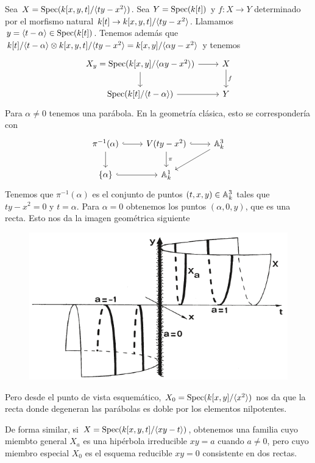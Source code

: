 \documentclass[GA.tex]{subfiles}
\begin{document}
\begin{ej}
Sea $X=\operatorname{Spec}(k[x,y,t]/\langle{ty-x^2}\rangle)$. Sea $Y=\operatorname{Spec}(k[t])$ y $f:X\to Y$ determinado por el morfismo natural $k[t]\to k[x,y,t]/\langle{ty-x^2}\rangle$. Llamamos $y=\langle{t-\alpha}\rangle\in\operatorname{Spec}(k[t])$. Tenemos además que $k[t]/\langle{t-\alpha}\rangle\otimes k[x,y,t]/\langle{ty-x^2}\rangle=k[x,y]/\langle{\alpha y-x^2}\rangle$ y tenemos
\[
\begin{tikzcd}
X_y=\spec(k[x,y]/\gene{\alpha y-x^2})\arrow[r] \arrow[d]  & X\arrow[d, "f"]\\
\spec(k[t]/\gene{t-\alpha})\arrow[r] & Y
\end{tikzcd}
\]
Para $\alpha\neq 0$ tenemos una parábola. En la geometría clásica, esto se correspondería con
\[
\begin{tikzcd}
\pi^{-1}(\alpha)\arrow[d]\arrow[r, hookrightarrow] & V(ty-x^2)\arrow[r, hookrightarrow]\arrow[d,"\pi"] & \A^3_k\arrow[dl]\\
\{\alpha\} \arrow[r, hookrightarrow] & \A^1_k & 
\end{tikzcd}
\]
Tenemos que $\pi^{-1}(\alpha)$ es el conjunto de puntos $(t,x,y)\in\mathbb{A}_k^3$ tales que $ty-x^2=0$ y $t=\alpha$. Para $\alpha=0$ obtenemos los puntos $(\alpha,0,y)$, que es una recta. Esto nos da la imagen geométrica siguiente
\begin{figure}[h!]
\includegraphics[scale=0.5]{3-3-1}
\end{figure}

Pero desde el punto de vista esquemático, $X_0=\operatorname{Spec}(k[x,y]/\langle{x^2}\rangle)$ nos da que la recta donde degeneran las parábolas es doble por los elementos nilpotentes. 
\end{ej}

\begin{ej}
De forma similar, si $X=\operatorname{Spec}(k[x,y,t]/\langle{xy-t}\rangle)$, obtenemos una familia cuyo miembto general $X_a$ es una hipérbola irreducible $xy=a$ cuando $a\neq 0$, pero cuyo miembro especial $X_0$ es el esquema reducible $xy=0$ consistente en dos rectas.
\end{ej}
\end{document}
